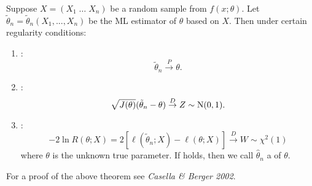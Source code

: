 \documentclass[notoc,notitlepage]{tufte-book}
\newcommand{\convd}{\overset{D}{\to}}
\newcommand{\convp}{\overset{P}{\to}}
\begin{document}
\begin{thm}
\label{thm:asymptotic_distribution_of_the_ml_estimator}
Suppose $X = (X_1 \; \hdots \; X_n)$ be a random sample from $f(x; \theta)$. Let $\tilde{\theta}_n = \tilde{\theta}_n(X_1, ..., X_n)$ be the ML estimator of $\theta$ based on $X$. Then under certain regularity conditions:
\begin{enumerate}
  \item {}:
    \begin{equation}\label{eq:consistency}
      \tilde{\theta}_n \convp \theta.
    \end{equation}
  \item {}:
    \begin{equation}\label{eq:asymptotic_normality}
      \sqrt{J(\theta)} ( \tilde{\theta}_n - \theta ) \convd Z \sim \Nor(0, 1).
    \end{equation}
  \item {}:
    \begin{equation*}
      - 2 \ln R(\theta; X) = 2 [ \ell(\tilde{\theta}_n ; X) - \ell(\theta; X) ] \convd W \sim \chi^2(1)
    \end{equation*}
    where $\theta$ is the unknown true parameter. If  holds, then we call $\hat{\theta}_n$ a  of $\theta$.
\end{enumerate}
\end{thm}

For a proof of the above theorem see \textit{Casella \& Berger 2002}\cite{CasellaBerger2002}.
\end{document}
